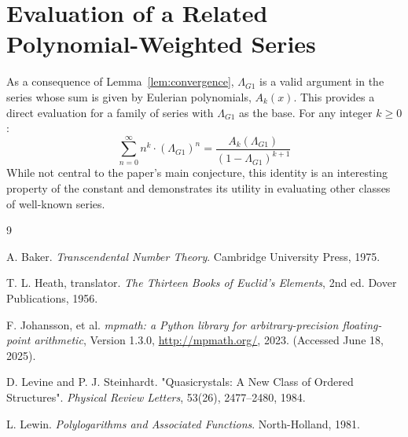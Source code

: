\documentclass{amsart}
\theoremstyle{plain}
\theoremstyle{definition}
\theoremstyle{remark}
\newcommand{\LambdaG}{\Lambda_{G1}}
\begin{document}
\section{Evaluation of a Related Polynomial-Weighted Series}
As a consequence of Lemma~\ref{lem:convergence}, $\LambdaG$ is a valid argument in the series whose sum is given by Eulerian polynomials, $A_k(x)$. This provides a direct evaluation for a family of series with $\LambdaG$ as the base. For any integer $k \ge 0$:
\[ \sum_{n=0}^{\infty} n^k \cdot (\LambdaG)^n = \frac{A_k(\LambdaG)}{(1-\LambdaG)^{k+1}} \]
While not central to the paper's main conjecture, this identity is an interesting property of the constant and demonstrates its utility in evaluating other classes of well-known series.

\begin{thebibliography}{9}

A. Baker. \textit{Transcendental Number Theory}. Cambridge University Press, 1975. 

T. L. Heath, translator. \textit{The Thirteen Books of Euclid's Elements}, 2nd ed. Dover Publications, 1956. 

F. Johansson, et al. \textit{mpmath: a Python library for arbitrary-precision floating-point arithmetic}, Version 1.3.0, \url{http://mpmath.org/}, 2023. (Accessed June 18, 2025). 

D. Levine and P. J. Steinhardt. "Quasicrystals: A New Class of Ordered Structures". \textit{Physical Review Letters}, 53(26), 2477--2480, 1984. 

L. Lewin. \textit{Polylogarithms and Associated Functions}. North-Holland, 1981.

\end{thebibliography}
\end{document}
